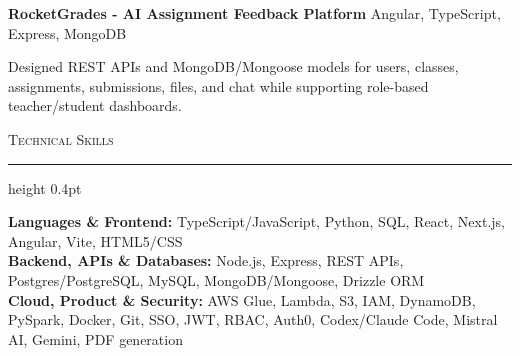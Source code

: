 \documentclass[letterpaper,11pt]{article}
\newcommand{\resumesection}[1]{%
  \par\vspace{2pt}%
  {\large\scshape #1}\par\vspace{2pt}%
  \hrule height 0.4pt\vspace{2pt}%
}
\newcommand{\projectHeading}[2]{
  \textbf{#1} \hfill #2
}
\begin{document}
\projectHeading{RocketGrades - AI Assignment Feedback Platform}{Angular, TypeScript, Express, MongoDB}
\begin{tightitemize}
  \item Designed REST APIs and MongoDB/Mongoose models for users, classes, assignments, submissions, files, and chat while supporting role-based teacher/student dashboards.
\end{tightitemize}

\resumesection{Technical Skills}
\textbf{Languages \& Frontend:} TypeScript/JavaScript, Python, SQL, React, Next.js, Angular, Vite, HTML5/CSS\\
\textbf{Backend, APIs \& Databases:} Node.js, Express, REST APIs, Postgres/PostgreSQL, MySQL, MongoDB/Mongoose, Drizzle ORM\\
\textbf{Cloud, Product \& Security:} AWS Glue, Lambda, S3, IAM, DynamoDB, PySpark, Docker, Git, SSO, JWT, RBAC, Auth0, Codex/Claude Code, Mistral AI, Gemini, PDF generation
\end{document}
